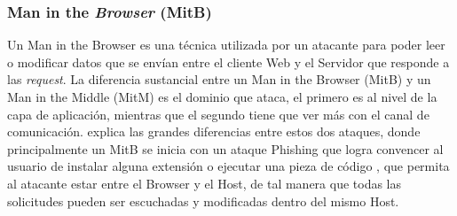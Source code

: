 	\subsubsection{Man in the \textit{Browser} (MitB)}
    Un Man in the Browser es una técnica utilizada por un atacante para poder leer o modificar datos que se envían entre el cliente Web y el Servidor que responde a las \textit{request}. La diferencia sustancial entre un Man in the Browser (MitB) y un Man in the Middle (MitM) es el dominio que ataca, el primero es al nivel de la capa de aplicación, mientras que el segundo tiene que ver más con el canal de comunicación. \cite{Dougan2012} explica las grandes diferencias entre estos dos ataques, donde principalmente un MitB se inicia con un ataque Phishing que logra convencer al usuario de instalar alguna extensión o ejecutar una pieza de código \cite{Utakrit2009, Paola2006}, que permita al atacante estar entre el Browser y el Host, de tal manera que todas las solicitudes pueden ser escuchadas y modificadas dentro del mismo Host.









